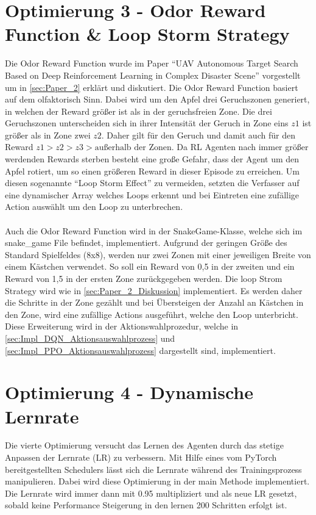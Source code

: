 \section{Optimierung 3 - Odor Reward Function \& Loop Storm Strategy}
Die Odor Reward Function wurde im Paper "`UAV Autonomous Target Search Based on Deep Reinforcement Learning in Complex Disaster Scene"' vorgestellt um in \ref{sec:Paper_2} erklärt und diskutiert. Die Odor Reward Function basiert auf dem olfaktorisch Sinn. Dabei wird um den Apfel drei Geruchszonen generiert, in welchen der Reward größer ist als in der geruchsfreien Zone. Die drei Geruchszonen unterscheiden sich in ihrer Intensität der Geruch in Zone eins $z1$ ist größer als in Zone zwei $z2$. Daher gilt für den Geruch und damit auch für den Reward $z1 > z2 > z3 > \text{außerhalb der Zonen}$.
Da RL Agenten nach immer größer werdenden Rewards sterben besteht eine große Gefahr, dass der Agent um den Apfel rotiert, um so einen größeren Reward in dieser Episode zu erreichen. Um diesen sogenannte "`Loop Storm Effect"'  zu vermeiden, setzten die Verfasser auf eine dynamischer Array welches Loops erkennt und bei Eintreten eine zufällige Action auswählt um den Loop zu unterbrechen.\\
\\Auch die Odor Reward Function wird in der SnakeGame-Klasse, welche sich im snake\_game File befindet, implementiert. Aufgrund der geringen Größe des Standard Spielfeldes (8x8), werden nur zwei Zonen mit einer jeweiligen Breite von einem Kästchen verwendet. So soll ein Reward von 0,5 in der zweiten und ein Reward von 1,5 in der ersten Zone zurückgegeben werden. Die loop Strom Strategy wird wie in \ref{sec:Paper_2_Diskussion} implementiert. Es werden daher die Schritte in der Zone gezählt und bei Übersteigen der Anzahl an Kästchen in den Zone, wird eine zufällige Actions ausgeführt, welche den Loop unterbricht. Diese Erweiterung wird in der Aktionswahlprozedur, welche in \ref{sec:Impl_DQN_Aktionsauswahlprozess} und \ref{sec:Impl_PPO_Aktionsauswahlprozess} dargestellt sind, implementiert.

\section{Optimierung 4 - Dynamische Lernrate}
Die vierte Optimierung versucht das Lernen des Agenten durch das stetige Anpassen der Lernrate (LR) zu verbessern. Mit Hilfe eines vom PyTorch bereitgestellten Schedulers lässt sich die Lernrate während des Trainingsprozess manipulieren. Dabei wird diese Optimierung in der main Methode implementiert.\\
Die Lernrate wird immer dann mit 0.95 multipliziert und als neue LR gesetzt, sobald keine Performance Steigerung in den lernen 200 Schritten erfolgt ist. 


